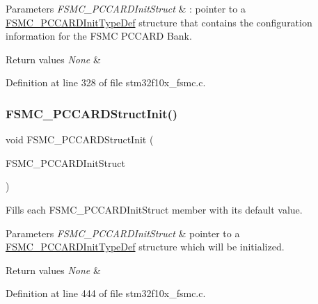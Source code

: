 \begin{DoxyParams}{Parameters}
{\em F\+S\+M\+C\+\_\+\+P\+C\+C\+A\+R\+D\+Init\+Struct} & \+: pointer to a \hyperlink{struct_f_s_m_c___p_c_c_a_r_d_init_type_def}{F\+S\+M\+C\+\_\+\+P\+C\+C\+A\+R\+D\+Init\+Type\+Def} structure that contains the configuration information for the F\+S\+MC P\+C\+C\+A\+RD Bank. \\
\hline
\end{DoxyParams}

\begin{DoxyRetVals}{Return values}
{\em None} & \\
\hline
\end{DoxyRetVals}


Definition at line 328 of file stm32f10x\+\_\+fsmc.\+c.

\mbox{\label{group___f_s_m_c___private___functions_ga7a64ba0e0545b3f1913c9d1d28c05e62}} 
\subsubsection{\texorpdfstring{F\+S\+M\+C\+\_\+\+P\+C\+C\+A\+R\+D\+Struct\+Init()}{FSMC\_PCCARDStructInit()}}
{\footnotesize\ttfamily void F\+S\+M\+C\+\_\+\+P\+C\+C\+A\+R\+D\+Struct\+Init (\begin{DoxyParamCaption}\item[{\hyperlink{struct_f_s_m_c___p_c_c_a_r_d_init_type_def}{F\+S\+M\+C\+\_\+\+P\+C\+C\+A\+R\+D\+Init\+Type\+Def} $\ast$}]{F\+S\+M\+C\+\_\+\+P\+C\+C\+A\+R\+D\+Init\+Struct }\end{DoxyParamCaption})}



Fills each F\+S\+M\+C\+\_\+\+P\+C\+C\+A\+R\+D\+Init\+Struct member with its default value. 


\begin{DoxyParams}{Parameters}
{\em F\+S\+M\+C\+\_\+\+P\+C\+C\+A\+R\+D\+Init\+Struct} & pointer to a \hyperlink{struct_f_s_m_c___p_c_c_a_r_d_init_type_def}{F\+S\+M\+C\+\_\+\+P\+C\+C\+A\+R\+D\+Init\+Type\+Def} structure which will be initialized. \\
\hline
\end{DoxyParams}

\begin{DoxyRetVals}{Return values}
{\em None} & \\
\hline
\end{DoxyRetVals}


Definition at line 444 of file stm32f10x\+\_\+fsmc.\+c.

